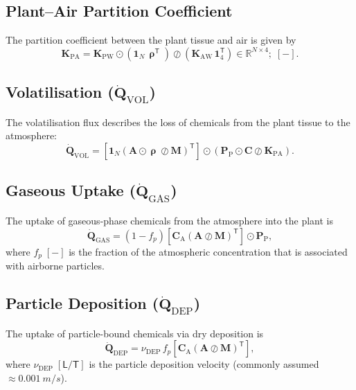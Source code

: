 \documentclass[12pt,a4paper]{article}
\newcommand{\R}{\mathbb{R}}
\newcommand{\oN}{\mathbf{1}_N}
\newcommand{\oFour}{\mathbf{1}_4}
\newcommand{\dL}{\mathsf{L}}
\newcommand{\dT}{\mathsf{T}}
\begin{document}
\subsection{Plant--Air Partition Coefficient}

The partition coefficient between the plant tissue and air is given by
\begin{equation}\label{eq:Kpa}
    \mathbf{K}_\mathrm{PA} = \mathbf{K}_\mathrm{PW} \odot \left(\oN\, \bm{\uprho}^\mathsf{T}\right) \oslash \left(\mathbf{K}_\mathrm{AW}\,\oFour^\mathsf{T}\right)\in \R^{N\times 4};\; [-].
\end{equation}


\subsection{Volatilisation (\texorpdfstring{$\dot{\mathbf{Q}}_\mathrm{VOL}$}{Q\_VOL})}\label{sec:vol}

The volatilisation flux describes the loss of chemicals from the plant tissue to the atmosphere:
\begin{equation}\label{eq:Qvol}
    \dot{\mathbf{Q}}_\mathrm{VOL} = \left[\oN\!\left(\mathbf{A}\odot \bm{\uprho}\oslash\mathbf{M}\right)^\mathsf{T}\right]\odot\left(\mathbf{P}_\mathrm{P}\odot\mathbf{C}\oslash\mathbf{K}_\mathrm{PA}\right).
\end{equation}


\subsection{Gaseous Uptake (\texorpdfstring{$\dot{\mathbf{Q}}_\mathrm{GAS}$}{Q\_GAS})}\label{sec:gas}

The uptake of gaseous-phase chemicals from the atmosphere into the plant is
\begin{equation}\label{eq:Qgas}
    \dot{\mathbf{Q}}_\mathrm{GAS} = (1-f_p)\left[\mathbf{C}_\mathrm{A}\!\left(\mathbf{A}\oslash\mathbf{M}\right)^\mathsf{T}\right]\odot\mathbf{P}_\mathrm{P},
\end{equation}
where $f_p\;[-]$ is the fraction of the atmospheric concentration that is associated with airborne particles.


\subsection{Particle Deposition (\texorpdfstring{$\dot{\mathbf{Q}}_\mathrm{DEP}$}{Q\_DEP})}\label{sec:dep}

The uptake of particle-bound chemicals via dry deposition is
\begin{equation}\label{eq:Qdep}
    \dot{\mathbf{Q}}_\mathrm{DEP} = \nu_\mathrm{DEP}\,f_p\left[\mathbf{C}_\mathrm{A}\!\left(\mathbf{A}\oslash\mathbf{M}\right)^\mathsf{T}\right],
\end{equation}
where $\nu_\mathrm{DEP}\;[\dL/\dT]$ is the particle deposition velocity (commonly assumed $\approx \SI{0.001}{m/s}$).
\end{document}
